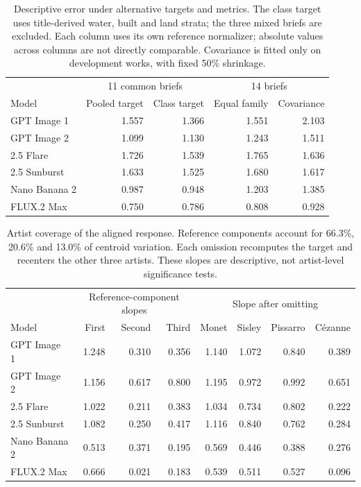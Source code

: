 \begin{table}[htbp]\centering\small
\begin{tabular}{@{}lrrrr@{}}\toprule
 & \multicolumn{2}{c}{11 common briefs} & \multicolumn{2}{c}{14 briefs}\\
Model & Pooled target & Class target & Equal family & Covariance\\\midrule
GPT Image 1 & 1.557 & 1.366 & 1.551 & 2.103\\
GPT Image 2 & 1.099 & 1.130 & 1.243 & 1.511\\
2.5 Flare & 1.726 & 1.539 & 1.765 & 1.636\\
2.5 Sunburst & 1.633 & 1.525 & 1.680 & 1.617\\
Nano Banana 2 & 0.987 & 0.948 & 1.203 & 1.385\\
FLUX.2 Max & 0.750 & 0.786 & 0.808 & 0.928\\
\bottomrule\end{tabular}
\caption{Descriptive error under alternative targets and metrics. The class target uses title-derived water, built and land strata; the three mixed briefs are excluded. Each column uses its own reference normalizer; absolute values across columns are not directly comparable. Covariance is fitted only on development works, with fixed 50\% shrinkage.}
\label{tab:review-targets}\end{table}
\begin{table}[htbp]\centering\small
\begin{tabular}{@{}lrrr|rrrr@{}}\toprule
 & \multicolumn{3}{c}{Reference-component slopes} & \multicolumn{4}{c}{Slope after omitting}\\
Model & First & Second & Third & Monet & Sisley & Pissarro & C\'ezanne\\\midrule
GPT Image 1 & 1.248 & 0.310 & 0.356 & 1.140 & 1.072 & 0.840 & 0.389\\
GPT Image 2 & 1.156 & 0.617 & 0.800 & 1.195 & 0.972 & 0.992 & 0.651\\
2.5 Flare & 1.022 & 0.211 & 0.383 & 1.034 & 0.734 & 0.802 & 0.222\\
2.5 Sunburst & 1.082 & 0.250 & 0.417 & 1.116 & 0.840 & 0.762 & 0.284\\
Nano Banana 2 & 0.513 & 0.371 & 0.195 & 0.569 & 0.446 & 0.388 & 0.276\\
FLUX.2 Max & 0.666 & 0.021 & 0.183 & 0.539 & 0.511 & 0.527 & 0.096\\
\bottomrule\end{tabular}
\caption{Artist coverage of the aligned response. Reference components account for 66.3\%, 20.6\% and 13.0\% of centroid variation. Each omission recomputes the target and recenters the other three artists. These slopes are descriptive, not artist-level significance tests.}
\label{tab:review-components}\end{table}
